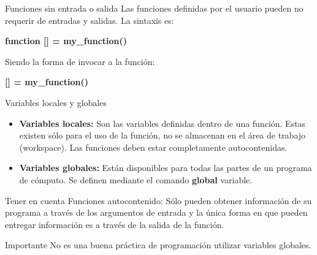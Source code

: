 \documentclass{bredelebeamer}
\begin{document}
\begin{frame}{Funciones sin entrada o salida}
Las funciones definidas por el usuario pueden no requerir de entradas y salidas. La sintaxis es:\\
\begin{center}
\textbf{function [] = my\_function()}
\end{center}
Siendo la forma de invocar a la función:
\begin{center}
\textbf{[] = my\_function()}
\end{center}
\end{frame}

\begin{frame}{Variables locales y globales}
\begin{itemize}
\item \textbf{Variables locales:} Son las variables definidas dentro de una función. Estas existen sólo para el uso de la función, no se almacenan en el área de trabajo (workspace). Las funciones deben estar completamente autocontenidas.
\item \textbf{Variables globales:} Están disponibles para todas las partes de un programa de cómputo. Se definen mediante el comando \textbf{global} variable.
\end{itemize}
\begin{block}{Tener en cuenta}
Funciones autocontenido: Sólo pueden obtener información de su programa a través de los argumentos de entrada y la única forma en que pueden entregar información es a través de la salida de la función.
\end{block}
\begin{alertblock}{Importante}
No es una buena práctica de programación utilizar variables globales.
\end{alertblock}
\end{frame}



\end{document}
